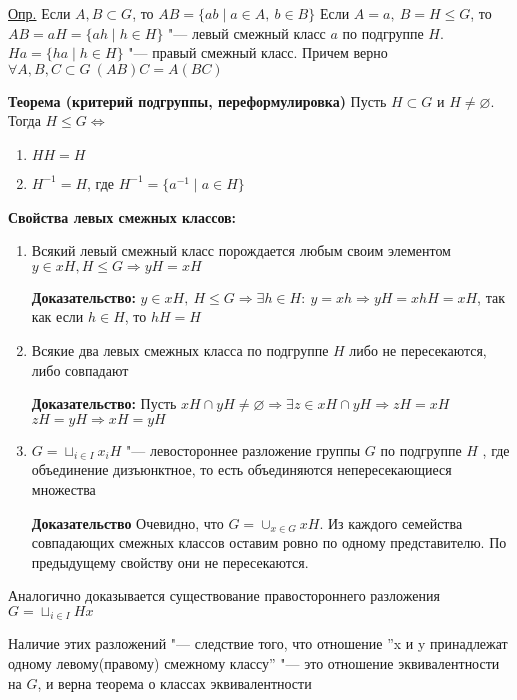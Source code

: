 \documentclass{article}
\begin{document}
\underline{Опр.} Если $A, B \subset G$, то $AB = \{ab \mid a \in A, \  b \in B\}$
Если $A = {a}, \  B = H \leq G$, то $AB = aH = \{ah \mid h \in H\}$ "--- левый смежный класс $a$ по подгруппе $H$.
$Ha = \{ha \mid h \in H\}$ "--- правый смежный класс.
Причем верно $\forall A,B,C \subset G \  (AB)C = A(BC)$

\vspace{10pt}

\textbf{Теорема (критерий подгруппы, переформулировка)}
Пусть $H \subset G$ и $H \neq \varnothing$. Тогда $H \leq G \Leftrightarrow$ 
\begin{enumerate}
	\item $HH = H$
	\item $H^{-1} = H$, где $H^{-1} = \{a^{-1} \mid a \in H\}$
\end{enumerate}

\vspace{10pt}

\textbf{Свойства левых смежных классов:}
\begin{enumerate}
	\item Всякий левый смежный класс порождается любым своим элементом $y \in xH, H \leq G \Rightarrow yH = xH$
	
	\textbf{Доказательство:}
	$y \in xH, \  H \leq G \Rightarrow \exists h \in H:\  y = xh \Rightarrow yH = xhH = xH$, так как если $h \in H$, то $hH = H$
	\item Всякие два левых смежных класса по подгруппе $H$ либо не пересекаются, либо совпадают
	
	\textbf{Доказательство:}
	Пусть $xH \cap yH \neq \varnothing \Rightarrow \exists z \in xH \cap yH \Rightarrow zH = xH$ $zH = yH \Rightarrow xH = yH$
	\item $G = \sqcup_{i \in I}x_iH$ "--- левостороннее разложение группы $G$ по подгруппе $H$ , где объединение дизъюнктное, то есть объединяются непересекающиеся множества
	
	\textbf{Доказательство}
	Очевидно, что $G = \cup_{x \in G}xH$. Из каждого семейства совпадающих смежных классов оставим ровно по одному представителю. По предыдущему свойству они не пересекаются.
\end{enumerate}

\vspace{10pt}

Аналогично доказывается существование правостороннего разложения $G = \sqcup_{i \in I}Hx$

Наличие этих разложений "--- следствие того, что отношение ''x и y принадлежат одному левому(правому) смежному классу'' "--- это отношение эквивалентности на $G$, и верна теорема о классах эквивалентности
\end{document}
